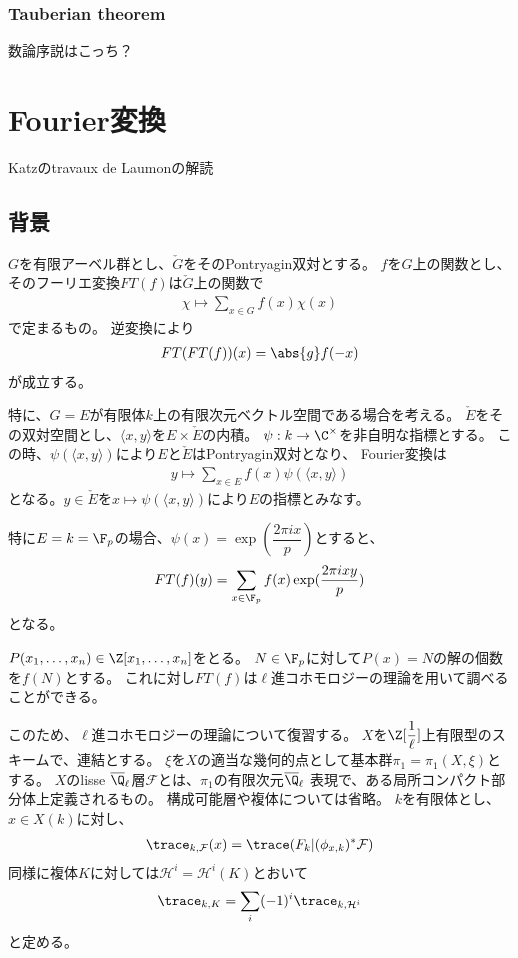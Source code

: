 \documentclass[uplatex, a4paper]{jsbook}
\begin{document}
\subsection{Tauberian theorem}
数論序説はこっち？

\chapter{Fourier変換}
Katzのtravaux de Laumonの解読
\section{背景}

$G$を有限アーベル群とし、$\check{G}$をそのPontryagin双対とする。
$f$を$G$上の関数とし、そのフーリエ変換$FT(f)$は$\check{G}$上の関数で
\begin{align*}
  \chi\mapsto\sum_{x\in G}f(x)\chi(x)
\end{align*}
で定まるもの。
逆変換により
\begin{align*}
  FT(FT(f))(x)=\abs{g}f(-x)
\end{align*}
が成立する。

特に、$G=E$が有限体$k$上の有限次元ベクトル空間である場合を考える。
$\check{E}$をその双対空間とし、$\langle x,y\rangle$を$E\times\check{E}$の内積。
$\psi:k \to \C^\times$を非自明な指標とする。
この時、$\psi(\langle x,y\rangle)$により$E$と$\check{E}$はPontryagin双対となり、
Fourier変換は
\begin{align*}
  y\mapsto\sum_{x\in E}f(x)\psi(\langle x,y\rangle)
\end{align*}
となる。$y\in\check{E}$を$x\mapsto \psi(\langle x,y\rangle)$により$E$の指標とみなす。

特に$E=k=\F_p$の場合、$\psi(x)=\exp(\dfrac{2\pi ix}{p})$とすると、
\begin{align*}
  FT(f)(y)=\sum_{x\in\F_p}f(x)\exp(\frac{2\pi ixy}{p})
\end{align*}
となる。

$P(x_1,\ldots,x_n)\in\Z[x_1,\ldots,x_n]$をとる。
$N\in\F_p$に対して$P(x)=N$の解の個数を$f(N)$とする。
これに対し$FT(f)$は$\ell$進コホモロジーの理論を用いて調べることができる。

このため、$\ell$進コホモロジーの理論について復習する。
$X$を$\Z[\dfrac{1}{\ell}]$上有限型のスキームで、連結とする。
$\xi$を$X$の適当な幾何的点として基本群$\pi_1=\pi_1(X,\xi)$とする。
$X$のlisse $\overline{\Q}_\ell$層$\mathcal{F}$とは、$\pi_1$の有限次元$\overline{\Q}_\ell$
表現で、ある局所コンパクト部分体上定義されるもの。
構成可能層や複体については省略。
$k$を有限体とし、$x\in X(k)$に対し、
\begin{align*}
  \trace_{k,\mathcal{F}}(x)=\trace(F_k\vert(\phi_{x,k})^*\mathcal{F})
\end{align*}
同様に複体$K$に対しては$\mathcal{H}^i=\mathcal{H}^i(K)$とおいて
\begin{align*}
  \trace_{k,K}=\sum_i(-1)^i\trace_{k,\mathcal{H}^i}
\end{align*}
と定める。
\end{document}
